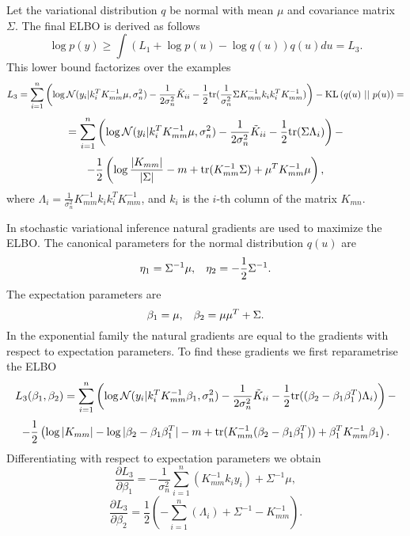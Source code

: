 \documentclass[12pt]{article}
\begin{document}
		Let the variational distribution $q$ be normal with mean $\mu$ and covariance matrix $\Sigma$. The final ELBO is derived as follows
		$$\log p(y) \ge \int \left( L_1 + \log p(u) - \log q(u)\right) q(u) du = L_3.$$
		This lower bound factorizes over the examples 
		$$L_3 = \sum_{i = 1}^{n} \left( \log \mathcal{N}(y_i | k_i^T K_{mm}^{-1} \mu, \sigma_n^2) - \frac 1 {2 \sigma_n^2} \tilde K_{ii} - \frac 1 2 \mbox{tr} (\frac 1 {\sigma_n^2} \Sigma K_{mm}^{-1} k_i k_i^T K_{mm}^{-1}) \right) - \mbox{KL}\left(q(u)\mbox{ || }p(u)\right) = $$
		$$ = \sum_{i = 1}^{n} \left( \log \mathcal{N}(y_i | k_i^T K_{mm}^{-1} \mu, \sigma_n^2) - \frac 1 {2 \sigma_n^2} \tilde K_{ii} - \frac 1 2 \mbox{tr} (\Sigma \Lambda_i) \right) - $$
		$$ -\frac 1 2 \left (\log \frac {|K_{mm}|} {|\Sigma|} - m + \mbox{tr}(K_{mm}^{-1} \Sigma) + \mu^T K_{mm}^{-1} \mu \right),$$
		where $\Lambda_i = \frac 1 {\sigma_n^2} K_{mm}^{-1} k_i k_i^T K_{mm}^{-1}$, and $k_i$ is the $i$-th column of the matrix $K_{mn}$.
		
		In stochastic variational inference natural gradients are used to maximize the ELBO. The canonical parameters for the normal distribution $q(u)$ are
		$$\eta_1 = \Sigma^{-1} \mu, \hspace{0.3cm}\eta_2 = - \frac 1 2 \Sigma^{-1}.$$
		The expectation parameters are
		$$\beta_1 = \mu, \hspace{0.3cm}\beta_2 = \mu \mu^T + \Sigma.$$
		In the exponential family the natural gradients are equal to the gradients with respect to expectation parameters. To find these gradients we first reparametrise the ELBO
		$$L_3(\beta_1, \beta_2) =  \sum_{i = 1}^{n} \left( \log \mathcal{N}(y_i | k_i^T K_{mm}^{-1} \beta_1, \sigma_n^2) - \frac 1 {2 \sigma_n^2} \tilde K_{ii} - \frac 1 2 \mbox{tr} ((\beta_2 - \beta_1 \beta_1^T) \Lambda_i) \right) - $$
		$$ -\frac 1 2 \left (\log |K_{mm}| - \log |\beta_2 - \beta_1 \beta_1^T| - m + \mbox{tr}(K_{mm}^{-1} (\beta_2 - \beta_1 \beta_1^T)) + \beta_1^T K_{mm}^{-1} \beta_1 \right).$$
		Differentiating with respect to expectation parameters we obtain
		\begin{equation}
			\label{natgrad1}
			\frac{\partial L_3} {\partial\beta_1} =  -\frac 1 {\sigma_n^2}  \sum_{i = 1}^{n} \left(K_{mm}^{-1} k_i y_i \right) + \Sigma^{-1} \mu,
		\end{equation}
		\begin{equation}
			\label{natgrad2}
			\frac{\partial L_3} {\partial\beta_2} = \frac 1 {2} \left(-\sum_{i = 1}^{n} (\Lambda_i) + \Sigma^{-1}  - K_{mm}^{-1}\right).
		\end{equation}
		
\end{document}
